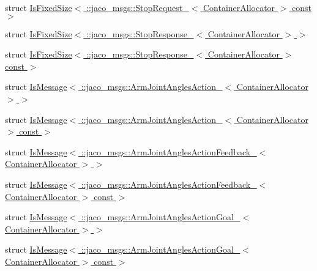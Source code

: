 \begin{DoxyCompactItemize}
\item 
struct \hyperlink{structros_1_1message__traits_1_1IsFixedSize_3_01_1_1jaco__msgs_1_1StopRequest___3_01ContainerAllocator_01_4_01const_01_01_4}{Is\+Fixed\+Size$<$ \+::jaco\+\_\+msgs\+::\+Stop\+Request\+\_\+$<$ Container\+Allocator $>$ const  $>$}
\item 
struct \hyperlink{structros_1_1message__traits_1_1IsFixedSize_3_01_1_1jaco__msgs_1_1StopResponse___3_01ContainerAllocator_01_4_01_4}{Is\+Fixed\+Size$<$ \+::jaco\+\_\+msgs\+::\+Stop\+Response\+\_\+$<$ Container\+Allocator $>$ $>$}
\item 
struct \hyperlink{structros_1_1message__traits_1_1IsFixedSize_3_01_1_1jaco__msgs_1_1StopResponse___3_01ContainerAllocator_01_4_01const_01_01_4}{Is\+Fixed\+Size$<$ \+::jaco\+\_\+msgs\+::\+Stop\+Response\+\_\+$<$ Container\+Allocator $>$ const  $>$}
\item 
struct \hyperlink{structros_1_1message__traits_1_1IsMessage_3_01_1_1jaco__msgs_1_1ArmJointAnglesAction___3_01ContainerAllocator_01_4_01_4}{Is\+Message$<$ \+::jaco\+\_\+msgs\+::\+Arm\+Joint\+Angles\+Action\+\_\+$<$ Container\+Allocator $>$ $>$}
\item 
struct \hyperlink{structros_1_1message__traits_1_1IsMessage_3_01_1_1jaco__msgs_1_1ArmJointAnglesAction___3_01Contaabb4dd378d711e08846c4ceacd75033f}{Is\+Message$<$ \+::jaco\+\_\+msgs\+::\+Arm\+Joint\+Angles\+Action\+\_\+$<$ Container\+Allocator $>$ const  $>$}
\item 
struct \hyperlink{structros_1_1message__traits_1_1IsMessage_3_01_1_1jaco__msgs_1_1ArmJointAnglesActionFeedback___3_01ContainerAllocator_01_4_01_4}{Is\+Message$<$ \+::jaco\+\_\+msgs\+::\+Arm\+Joint\+Angles\+Action\+Feedback\+\_\+$<$ Container\+Allocator $>$ $>$}
\item 
struct \hyperlink{structros_1_1message__traits_1_1IsMessage_3_01_1_1jaco__msgs_1_1ArmJointAnglesActionFeedback___3b1ef297bc1c6196ad34acc9f66f3a4eb}{Is\+Message$<$ \+::jaco\+\_\+msgs\+::\+Arm\+Joint\+Angles\+Action\+Feedback\+\_\+$<$ Container\+Allocator $>$ const  $>$}
\item 
struct \hyperlink{structros_1_1message__traits_1_1IsMessage_3_01_1_1jaco__msgs_1_1ArmJointAnglesActionGoal___3_01ContainerAllocator_01_4_01_4}{Is\+Message$<$ \+::jaco\+\_\+msgs\+::\+Arm\+Joint\+Angles\+Action\+Goal\+\_\+$<$ Container\+Allocator $>$ $>$}
\item 
struct \hyperlink{structros_1_1message__traits_1_1IsMessage_3_01_1_1jaco__msgs_1_1ArmJointAnglesActionGoal___3_01Caf0bf283517c2e9e9dc51e4492f87e44}{Is\+Message$<$ \+::jaco\+\_\+msgs\+::\+Arm\+Joint\+Angles\+Action\+Goal\+\_\+$<$ Container\+Allocator $>$ const  $>$}

\end{DoxyCompactItemize}
